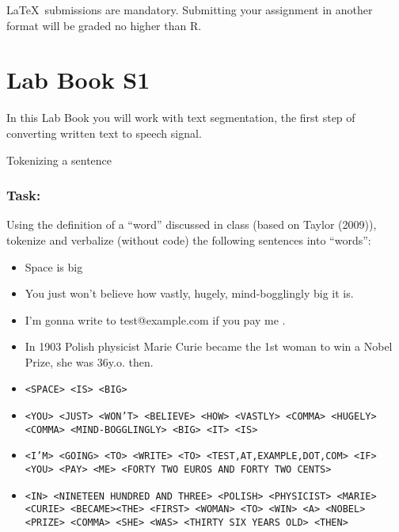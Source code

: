 \documentclass{../labbook}
\begin{document}
\begin{mdframed}[backgroundcolor=blue!20]
\LaTeX ~submissions are mandatory. Submitting your assignment in another format will be graded no higher than R.
\end{mdframed}

\section{Lab Book S1}
In this Lab Book you will work with text segmentation, the first step of converting written text to speech signal.

\begin{problem}{1}{3}{Tokenizing a sentence}

\subsubsection*{Task:}
Using the definition of a ``word'' discussed in class (based on Taylor (2009)), tokenize and verbalize (without code) the following sentences into ``words'':
\begin{itemize}
    \item Space is big
    \item You just won't believe how vastly, hugely, mind-bogglingly big it is.
    \item I'm gonna write to test@example.com if you pay me .
    \item In 1903 Polish physicist Marie Curie became the 1st woman to win a Nobel Prize, she was 36y.o. then.
\end{itemize}
\end{problem}
\begin{solution}
\begin{itemize}
    \item \texttt{<SPACE> <IS> <BIG>}
    \item \texttt{<YOU> <JUST> <WON'T> <BELIEVE> <HOW> <VASTLY> <COMMA> <HUGELY> <COMMA> <MIND-BOGGLINGLY> <BIG> <IT> <IS> }
    \item \texttt{<I'M> <GOING> <TO> <WRITE> <TO> <TEST,AT,EXAMPLE,DOT,COM> 
    <IF> <YOU> <PAY> <ME> <FORTY TWO EUROS AND FORTY TWO CENTS>}
    \item \texttt{<IN> <NINETEEN HUNDRED AND THREE> <POLISH> <PHYSICIST> <MARIE> <CURIE> <BECAME><THE> <FIRST> <WOMAN> <TO> <WIN> <A> <NOBEL> <PRIZE> <COMMA> <SHE> <WAS> <THIRTY SIX YEARS OLD> <THEN>}
\end{itemize}
\end{solution}
\end{document}
